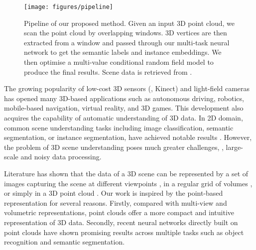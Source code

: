 \documentclass[10pt,twocolumn,letterpaper]{article}
\begin{document}
\begin{figure*}[t]
    \centering
    \texttt{[image: figures/pipeline]}
    \caption{Pipeline of our proposed method. Given an input 3D point cloud, we
      scan the point cloud by overlapping windows. 3D vertices are then
      extracted from a window and passed through our multi-task neural network
      to get the semantic labels and instance embeddings. We then optimise a
      multi-value conditional random field model to produce the final
      results. Scene data is retrieved from \cite{hua-scenenn-3dv16}.}
    \label{fig:pipeline}
\end{figure*}

The growing popularity of low-cost 3D sensors (\eg, Kinect) and light-field
cameras has opened many 3D-based applications such as autonomous driving,
robotics, mobile-based navigation, virtual reality, and 3D games. This
development also acquires the capability of automatic understanding of 3D
data. In 2D domain, common scene understanding tasks including image
classification, semantic segmentation, or instance segmentation, have achieved
notable results \cite{he-maskrcnn-iccv17, chen-deeplab-pami18}. However, the
problem of 3D scene understanding poses much greater challenges, \eg,
large-scale and noisy data processing.

Literature has shown that the data of a 3D scene can be represented by a set of
images capturing the scene at different viewpoints \cite{hermans-dense-icra14,
  wolf-fast-icra15, vineet-incremental-icra15}, in a regular grid of volumes
\cite{wu-shapenets-cvpr15, maturana-voxnet-iros15, nguyen-field-cvpr16}, or
simply in a 3D point cloud \cite{qi-pointnet++-nips17, hua-pointwise-cvpr18,
  wang-dgcnn-arxiv18, huang-rsnet-cvpr18, li-pointcnn-nips18}. Our work is
inspired by the point-based representation for several reasons. Firstly,
compared with multi-view and volumetric representations, point clouds offer a
more compact and intuitive representation of 3D data. Secondly, recent neural
networks directly built on point clouds \cite{qi-pointnet++-nips17,
  hua-pointwise-cvpr18, li-pointcnn-nips18, wang-dgcnn-arxiv18,
  huang-rsnet-cvpr18, klokov-escape-iccv17, landrieu-superpoint-cvpr18,
  li-sonet-cvpr18, xu-spidercnn-eccv18} have shown promising results across
multiple tasks such as object recognition and semantic segmentation.
\end{document}
